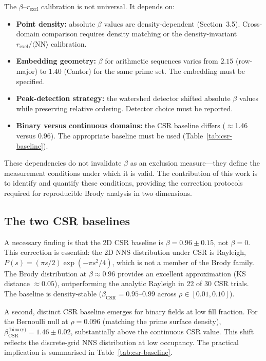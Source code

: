 \documentclass[final,1p,times]{elsarticle}
\theoremstyle{definition}
\begin{document}
The $\beta$--$r_{\text{excl}}$ calibration is not universal.
It depends on:
\begin{itemize}
  \item \textbf{Point density:} absolute $\beta$ values are
density-dependent (Section~3.5). Cross-domain comparison requires
density matching or the density-invariant
$r_{\text{excl}}/\langle\text{NN}\rangle$ calibration.
  \item \textbf{Embedding geometry:} $\beta$ for arithmetic
sequences varies from $2.15$ (row-major) to $1.40$ (Cantor) for
the same prime set. The embedding must be specified.
  \item \textbf{Peak-detection strategy:} the watershed detector
shifted absolute $\beta$ values while preserving relative
ordering. Detector choice must be reported.
  \item \textbf{Binary versus continuous domains:} the CSR baseline
differs ($\approx$1.46 versus 0.96). The appropriate baseline
must be used (Table~\ref{tab:csr-baseline}).
\end{itemize}
These dependencies do not invalidate $\beta$ as an exclusion
measure---they define the measurement conditions under which it
is valid. The contribution of this work is to identify and quantify
these conditions, providing the correction protocols required for
reproducible Brody analysis in two dimensions.

\subsection{The two CSR baselines}

A necessary finding is that the 2D CSR baseline is
$\beta=0.96\pm0.15$, not $\beta=0$. This correction is essential:
the 2D NNS distribution under CSR is Rayleigh,
$P(s)=(\pi s/2)\exp(-\pi s^2/4)$, which is not a member of the
Brody family. The Brody distribution at $\beta\approx0.96$ provides
an excellent approximation (KS distance $\approx0.05$), outperforming
the analytic Rayleigh in 22 of 30 CSR trials. The baseline is
density-stable ($\beta_{\text{CSR}}=0.95$--$0.99$ across
$\rho\in[0.01,0.10]$).

A second, distinct CSR baseline emerges for binary fields at low fill
fraction. For the Bernoulli null at $\rho=0.096$ (matching the prime
surface density), $\beta_{\text{CSR}}^{\text{(binary)}}=1.46\pm0.02$,
substantially above the continuous CSR value. This shift reflects the
discrete-grid NNS distribution at low occupancy. The practical
implication is summarised in Table~\ref{tab:csr-baseline}.
\end{document}
